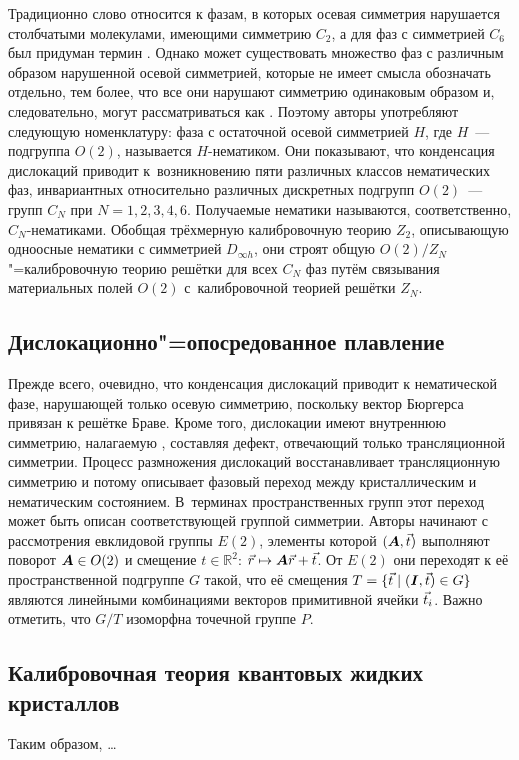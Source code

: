 \documentclass[a4paper, 14pt, titlepage]{extarticle}
\newcommand{\R}{\mathbb{R}}  %
\begin{document}
  Традиционно слово  относится к фазам, в которых осевая симметрия нарушается
  столбчатыми молекулами, имеющими симметрию $C_2$, а для фаз с симметрией $C_6$ был придуман термин
  . Однако может существовать множество фаз с различным образом нарушенной осевой
  симметрией, которые не имеет смысла обозначать отдельно, тем более, что все они нарушают симметрию
  одинаковым образом и, следовательно, могут рассматриваться как . Поэтому авторы
  употребляют следующую номенклатуру: фаза с остаточной осевой симметрией $H$, где $H$~--- подгруппа
  $O(2)$, называется $H$-нематиком. Они показывают, что конденсация дислокаций приводит
  к~возникновению пяти различных классов нематических фаз, инвариантных относительно различных
  дискретных подгрупп $O(2)$~--- групп $C_N$ при $N = 1,2,3,4,6$. Получаемые нематики называются,
  соответственно, $C_N$-нематиками.  Обобщая трёхмерную калибровочную теорию $Z_2$, описывающую
  одноосные нематики с симметрией $D_{\infty h}$, они строят общую $O(2)/Z_N$"=калибровочную теорию
  решётки для всех $C_N$ фаз путём связывания материальных полей $O(2)$ с~калибровочной теорией
  решётки $Z_N$.

  \subsection{Дислокационно"=опосредованное плавление}

  Прежде всего, очевидно, что конденсация дислокаций приводит к нематической фазе, нарушающей только
  осевую симметрию, поскольку вектор Бюргерса привязан к решётке Браве. Кроме того, дислокации имеют
  внутреннюю симметрию, налагаемую , составляя дефект, отвечающий
  только трансляционной симметрии. Процесс размножения дислокаций восстанавливает трансляционную
  симметрию и потому описывает фазовый переход между кристаллическим и нематическим состоянием.
  В~терминах пространственных групп этот переход может быть описан соответствующей группой симметрии.
  Авторы начинают с рассмотрения евклидовой группы $E(2)$, элементы которой $(\bm{A},\vec{t})$
  выполняют поворот $\bm{A} \in O(2)$ и смещение $t \in \R^2$: $\vec{r} \mapsto \bm{A}\vec{r} + \vec{t}$.
  От $E(2)$ они переходят к её пространственной подгруппе $G$ такой, что её смещения
  $T = \{\vec{t} \mid (\bm{I},\vec{t}) \in G\}$ являются линейными комбинациями векторов
  примитивной ячейки $\vec{t}_i$. Важно отметить, что $G/T$ изоморфна точечной группе $P$.

  \subsection{Калибровочная теория квантовых жидких кристаллов}


  Таким образом, \dots

  \PrintBibliography
\end{document}
